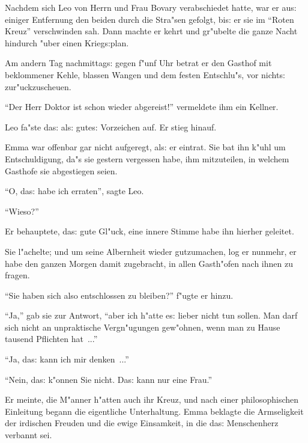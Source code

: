 \documentclass[oneside,12pt]{book}
\newcommand{\s}{s:}%
\begin{document}
Nachdem sich Leo von Herrn und Frau Bovary verabschiedet hatte,
war er au{\s} einiger Entfernung den beiden durch die Stra"sen
gefolgt, bi{\s} er sie im "`Roten Kreuz"' verschwinden sah. Dann
machte er kehrt und gr"ubelte die ganze Nacht hindurch "uber einen
Krieg{\s}plan.

Am andern Tag nachmittag{\s} gegen f"unf Uhr betrat er den Gasthof
mit beklommener Kehle, blassen Wangen und dem festen Entschlu"s,
vor nicht{\s} zur"uckzuscheuen.

"`Der Herr Doktor ist schon wieder abgereist!"' vermeldete ihm ein
Kellner.

Leo fa"ste da{\s} al{\s} gute{\s} Vorzeichen auf. Er stieg hinauf.

Emma war offenbar gar nicht aufgeregt, al{\s} er eintrat. Sie bat
ihn k"uhl um Entschuldigung, da"s sie gestern vergessen habe, ihm
mit\/zuteilen, in welchem Gasthofe sie abgestiegen seien.

"`O, da{\s} habe ich erraten"', sagte Leo.

"`Wieso?"'

Er behauptete, da{\s} gute Gl"uck, eine innere Stimme habe ihn
hierher geleitet.

Sie l"achelte; und um seine Albernheit wieder gut\/zumachen, log
er nunmehr, er habe den ganzen Morgen damit zugebracht, in allen
Gasth"ofen nach ihnen zu fragen.

"`Sie haben sich also entschlossen zu bleiben?"' f"ugte er hinzu.

"`Ja,"' gab sie zur Antwort, "`aber ich h"atte e{\s} lieber nicht
tun sollen. Man darf sich nicht an unpraktische Vergn"ugungen
gew"ohnen, wenn man zu Hause tausend Pflichten hat~..."'

"`Ja, da{\s} kann ich mir denken~..."'

"`Nein, da{\s} k"onnen Sie nicht. Da{\s} kann nur eine Frau."'

Er meinte, die M"anner h"atten auch ihr Kreuz, und nach einer
philosophischen Einleitung begann die eigentliche Unterhaltung.
Emma beklagte die Armseligkeit der irdischen Freuden und die ewige
Einsamkeit, in die da{\s} Menschenherz verbannt sei.
\end{document}
